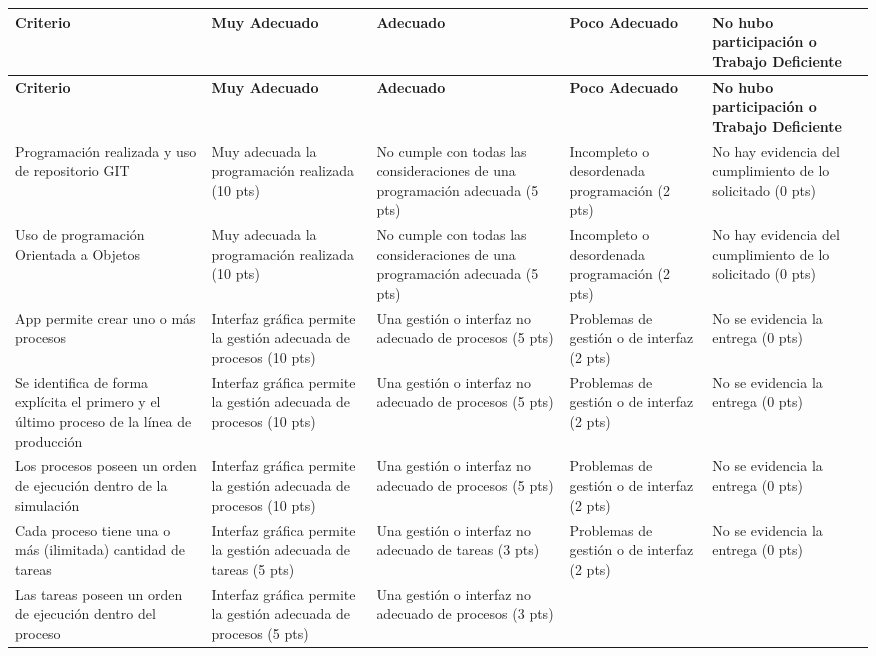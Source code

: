 \documentclass[12pt,letterpaper]{article}
\begin{document}
\small
\begin{longtable}{|p{3.2cm}|p{3cm}|p{3cm}|p{2.5cm}|p{2.5cm}|}
\hline
\textbf{Criterio} & \textbf{Muy Adecuado} & \textbf{Adecuado} & \textbf{Poco Adecuado} & \textbf{No hubo participación o Trabajo Deficiente} \\
\hline
\endfirsthead
\hline
\textbf{Criterio} & \textbf{Muy Adecuado} & \textbf{Adecuado} & \textbf{Poco Adecuado} & \textbf{No hubo participación o Trabajo Deficiente} \\
\hline
\endhead
Programación realizada y uso de repositorio GIT &
Muy adecuada la programación realizada (10 pts) &
No cumple con todas las consideraciones de una programación adecuada (5 pts) &
Incompleto o desordenada programación (2 pts) &
No hay evidencia del cumplimiento de lo solicitado (0 pts) \\
\hline
Uso de programación Orientada a Objetos &
Muy adecuada la programación realizada (10 pts) &
No cumple con todas las consideraciones de una programación adecuada (5 pts) &
Incompleto o desordenada programación (2 pts) &
No hay evidencia del cumplimiento de lo solicitado (0 pts) \\
\hline
App permite crear uno o más procesos &
Interfaz gráfica permite la gestión adecuada de procesos (10 pts) &
Una gestión o interfaz no adecuado de procesos (5 pts) &
Problemas de gestión o de interfaz (2 pts) &
No se evidencia la entrega (0 pts) \\
\hline
Se identifica de forma explícita el primero y el último proceso de la línea de producción &
Interfaz gráfica permite la gestión adecuada de procesos (10 pts) &
Una gestión o interfaz no adecuado de procesos (5 pts) &
Problemas de gestión o de interfaz (2 pts) &
No se evidencia la entrega (0 pts) \\
\hline
Los procesos poseen un orden de ejecución dentro de la simulación &
Interfaz gráfica permite la gestión adecuada de procesos (10 pts) &
Una gestión o interfaz no adecuado de procesos (5 pts) &
Problemas de gestión o de interfaz (2 pts) &
No se evidencia la entrega (0 pts) \\
\hline
Cada proceso tiene una o más (ilimitada) cantidad de tareas &
Interfaz gráfica permite la gestión adecuada de tareas (5 pts) &
Una gestión o interfaz no adecuado de tareas (3 pts) &
Problemas de gestión o de interfaz (2 pts) &
No se evidencia la entrega (0 pts) \\
\hline
Las tareas poseen un orden de ejecución dentro del proceso &
Interfaz gráfica permite la gestión adecuada de procesos (5 pts) &
Una gestión o interfaz no adecuado de procesos (3 pts) &

\end{longtable}
\end{document}
